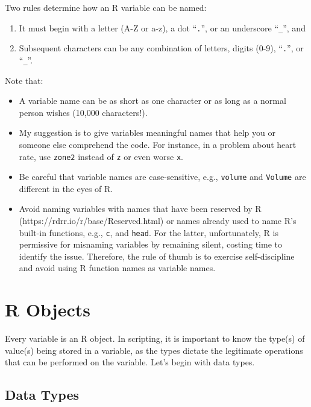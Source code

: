 \documentclass[
  letterpaper,
  DIV=11,
  numbers=noendperiod]{scrreprt}
\begin{document}
Two rules determine how an R variable can be named:

\begin{enumerate}
\def\labelenumi{\arabic{enumi}.}
\item
  It must begin with a letter (A-Z or a-z), a dot ``\texttt{.}'', or an
  underscore ``\texttt{\_}'', and
\item
  Subsequent characters can be any combination of letters, digits (0-9),
  ``\texttt{.}'', or ``\texttt{\_}''.
\end{enumerate}

Note that:

\begin{itemize}
\item
  A variable name can be as short as one character or as long as a
  normal person wishes (10,000 characters!).
\item
  My suggestion is to give variables meaningful names that help you or
  someone else comprehend the code. For instance, in a problem about
  heart rate, use \texttt{zone2} instead of \texttt{z} or even worse
  \texttt{x}.
\item
  Be careful that variable names are case-sensitive, e.g.,
  \texttt{volume} and \texttt{Volume} are different in the eyes of R.
\item
  Avoid naming variables with names that have been reserved by R
  (https://rdrr.io/r/base/Reserved.html) or names already used to name
  R's built-in functions, e.g., \texttt{c}, and \texttt{head}. For the
  latter, unfortunately, R is permissive for misnaming variables by
  remaining silent, costing time to identify the issue. Therefore, the
  rule of thumb is to exercise self-discipline and avoid using R
  function names as variable names.
\end{itemize}

\section{R Objects}\label{r-objects}

Every variable is an R object. In scripting, it is important to know the
type(s) of value(s) being stored in a variable, as the types dictate the
legitimate operations that can be performed on the variable. Let's begin
with data types.

\subsection{Data Types}\label{sec-data-types}
\end{document}
